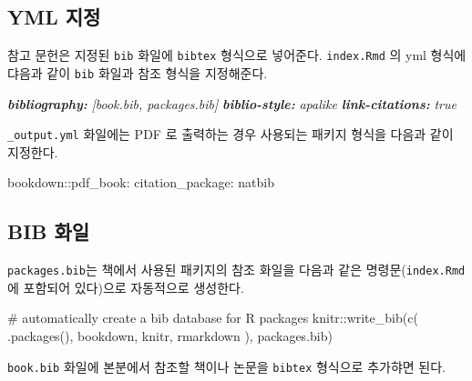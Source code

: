 \documentclass[
]{book}
\newenvironment{Shaded}{\begin{snugshade}}{\end{snugshade}}
\newcommand{\AnnotationTok}[1]{\textcolor[rgb]{0.56,0.35,0.01}{\textbf{\textit{#1}}}}
\newcommand{\CommentTok}[1]{\textcolor[rgb]{0.56,0.35,0.01}{\textit{#1}}}
\newcommand{\FunctionTok}[1]{\textcolor[rgb]{0.00,0.00,0.00}{#1}}
\newcommand{\NormalTok}[1]{#1}
\theoremstyle{definition}
\theoremstyle{definition}
\theoremstyle{definition}
\theoremstyle{definition}
\theoremstyle{remark}
\begin{document}
\hypertarget{yml-uxc9c0uxc815}{%
\subsection{YML 지정}\label{yml-uxc9c0uxc815}}

참고 문헌은 지정된 \texttt{bib} 화일에 \texttt{bibtex} 형식으로 넣어준다. \texttt{index.Rmd} 의 yml 형식에 댜음과 같이
\texttt{bib} 화일과 참조 형식을 지정해준다.

\begin{Shaded}
\begin{Highlighting}[]
\AnnotationTok{bibliography:}\CommentTok{ [book.bib, packages.bib]}
\AnnotationTok{biblio{-}style:}\CommentTok{ apalike}
\AnnotationTok{link{-}citations:}\CommentTok{ true}
\end{Highlighting}
\end{Shaded}

\texttt{\_output.yml} 화일에는 PDF 로 출력하는 경우 사용되는 패키지 형식을 다음과 같이 지정한다.

\begin{Shaded}
\begin{Highlighting}[]
\NormalTok{bookdown::pdf\_book:}
\NormalTok{  citation\_package: natbib}
\end{Highlighting}
\end{Shaded}

\hypertarget{bib-uxd654uxc77c}{%
\subsection{BIB 화일}\label{bib-uxd654uxc77c}}

\texttt{packages.bib}는 책에서 사용된 패키지의 참조 화일을 다음과 같은 명령문(\texttt{index.Rmd} 에 포함되어 있다)으로 자동적으로 생성한다.

\begin{Shaded}
\begin{Highlighting}[]
\FunctionTok{\# automatically create a bib database for R packages}
\NormalTok{knitr::write\_bib(c(}
\NormalTok{  .packages(), \textquotesingle{}bookdown\textquotesingle{}, \textquotesingle{}knitr\textquotesingle{}, \textquotesingle{}rmarkdown\textquotesingle{}}
\NormalTok{), \textquotesingle{}packages.bib\textquotesingle{})}
\end{Highlighting}
\end{Shaded}

\texttt{book.bib} 화일에 본분에서 참조할 책이나 논문을 \texttt{bibtex} 형식으로 추가햐면 된다.
\end{document}
